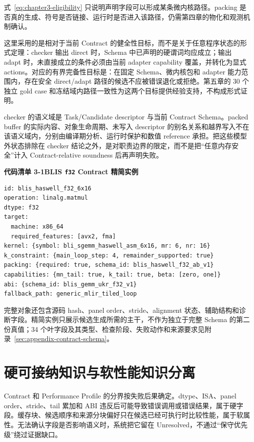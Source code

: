 式~\eqref{eq:chapter3-eligibility} 只说明声明字段可以形成某条微内核路径。packing 是否真的生成、符号是否链接、运行时是否进入该路径，仍需第四章的物化和观测机制确认。

这里采用的是相对于当前 Contract 的健全性目标，而不是关于任意程序状态的形式定理：checker 输出 direct 时，Schema 中已声明的硬谓词均应成立；输出 adapt 时，未直接成立的条件必须由当前 adapter capability 覆盖，并转化为显式 actions。对应的有界完备性目标是：在固定 Schema、微内核包和 adapter 能力范围内，存在安全 direct/adapt 路径的候选不应被错误退化或拒绝。第五章的 30 个独立 gold case 和冻结域内路径一致性为这两个目标提供经验支持，不构成形式证明。

checker 的语义域是 Task/Candidate descriptor 与当前 Contract Schema。packed buffer 的实际内容、对象生命周期、未写入 descriptor 的别名关系和越界写入不在该语义域内，分别由编译期分析、运行时保护和数值 reference 承担。把这些模型外状态排除在 checker 结论之外，是对职责边界的限定，而不是把“任意内存安全”计入 Contract-relative soundness 后再声明失败。

\noindent\textbf{代码清单 3-1\quad BLIS \texttt{f32} Contract 精简实例}
\begin{verbatim}
id: blis_haswell_f32_6x16
operation: linalg.matmul
dtype: f32
target:
  machine: x86_64
  required_features: [avx2, fma]
kernel: {symbol: bli_sgemm_haswell_asm_6x16, mr: 6, nr: 16}
k_constraint: {main_loop_step: 4, remainder_supported: true}
packing: {required: true, schema_id: blis_haswell_f32_ab_v1}
capabilities: {mn_tail: true, k_tail: true, beta: [zero, one]}
abi: {schema_id: blis_gemm_ukr_f32_v1}
fallback_path: generic_mlir_tiled_loop
\end{verbatim}

完整对象还包含源码 hash、panel order、stride、alignment 状态、辅助结构和诊断字段。精简实例只展示候选生成所需的主干，不作为独立于完整 Schema 的第二份真值；34 个叶字段及其类型、检查阶段、失败动作和来源要求见附录~\ref{sec:appendix-contract-schema}。

\section{硬可接纳知识与软性能知识分离}

Contract 和 Performance Profile 的分界按失败后果确定。dtype、ISA、panel order、stride、tail 累加和 ABI 违反后可能导致错误调用或错误结果，属于硬字段。缓存块、候选顺序和来源分块偏好只在候选已经可执行时比较性能，属于软属性。无法确认字段是否影响语义时，系统把它留在 Unresolved，不通过“保守优先级”绕过证据缺口。

